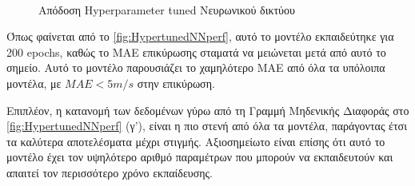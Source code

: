\begin{figure}[H]
  \centering
   \\

\caption{Απόδοση \textlatin{Hyperparameter tuned} Νευρωνικού δικτύου}
  \label{fig:HypertunedNNperf}
\end{figure}

Όπως φαίνεται από το \autoref{fig:HypertunedNNperf}, αυτό το μοντέλο εκπαιδεύτηκε για 200 \textlatin{epochs}, καθώς το MAE επικύρωσης σταματά να μειώνεται μετά από αυτό το σημείο. Αυτό το μοντέλο παρουσιάζει το χαμηλότερο MAE από όλα τα υπόλοιπα μοντέλα, με \(MAE < 5 m/s\) στην επικύρωση.

Επιπλέον, η κατανομή των δεδομένων γύρω από τη Γραμμή Μηδενικής Διαφοράς στο \autoref{fig:HypertunedNNperf} (γ'), είναι η πιο στενή από όλα τα μοντέλα, παράγοντας έτσι τα καλύτερα αποτελέσματα μέχρι στιγμής. Αξιοσημείωτο είναι επίσης ότι αυτό το μοντέλο έχει τον υψηλότερο αριθμό παραμέτρων που μπορούν να εκπαιδευτούν και απαιτεί τον περισσότερο χρόνο εκπαίδευσης.

